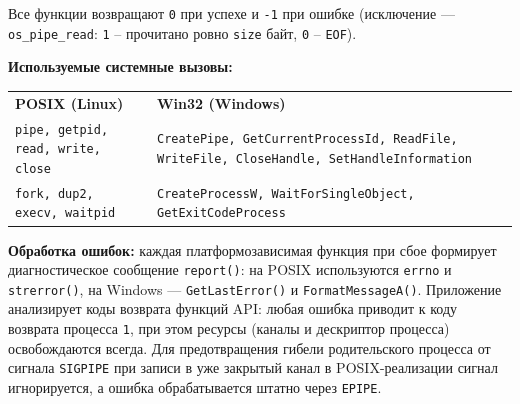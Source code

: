 Все функции возвращают \texttt{0} при успехе и \texttt{-1} при ошибке
(исключение --- \texttt{os\_pipe\_read}: \texttt{1} -- прочитано ровно \texttt{size} байт,
\texttt{0} -- \texttt{EOF}).

\textbf{Используемые системные вызовы:}

\begin{center}
\begin{tabular}{p{}p{}}
\textbf{POSIX (Linux)} & \textbf{Win32 (Windows)} \\
\texttt{pipe, getpid, read, write, close} & \texttt{CreatePipe, GetCurrentProcessId, ReadFile, WriteFile, CloseHandle, SetHandleInformation} \\
\texttt{fork, dup2, execv, waitpid}       & \texttt{CreateProcessW, WaitForSingleObject, GetExitCodeProcess} \\
\end{tabular}
\end{center}

\textbf{Обработка ошибок:} каждая платформозависимая функция при сбое формирует диагностическое
сообщение \texttt{report()}: на POSIX используются \texttt{errno} и \texttt{strerror()}, на Windows
--- \texttt{GetLastError()} и \texttt{FormatMessageA()}. Приложение анализирует коды возврата
функций API: любая ошибка приводит к коду возврата процесса \texttt{1}, при этом ресурсы (каналы и
дескриптор процесса) освобождаются всегда. Для предотвращения гибели родительского процесса от
сигнала \texttt{SIGPIPE} при записи в уже закрытый канал в POSIX-реализации сигнал игнорируется, а
ошибка обрабатывается штатно через \texttt{EPIPE}.
